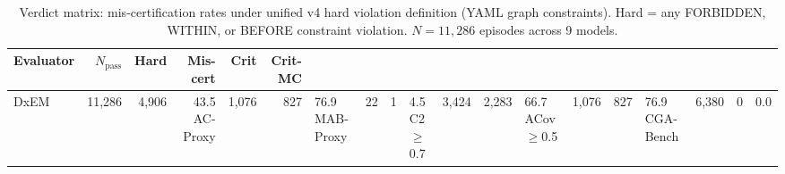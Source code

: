 \begin{table}[t]
\centering
\caption{Verdict matrix: mis-certification rates under unified v4 hard violation definition (YAML graph constraints). Hard = any FORBIDDEN, WITHIN, or BEFORE constraint violation. $N = 11,286$ episodes across 9 models.}
\label{tab:verdict-matrix-v6}
\begin{tabular}{lrrrrr}
\toprule
Evaluator & $N_{\text{pass}}$ & Hard & Mis-cert & Crit & Crit-MC \\
\midrule
DxEM & 11,286 & 4,906 & 43.5%
AC-Proxy & 1,076 & 827 & 76.9%
MAB-Proxy & 22 & 1 & 4.5%
C2$\geq$0.7 & 3,424 & 2,283 & 66.7%
ACov$\geq$0.5 & 1,076 & 827 & 76.9%
\midrule
CGA-Bench & 6,380 & 0 & 0.0%
\bottomrule
\end{tabular}
\end{table}
